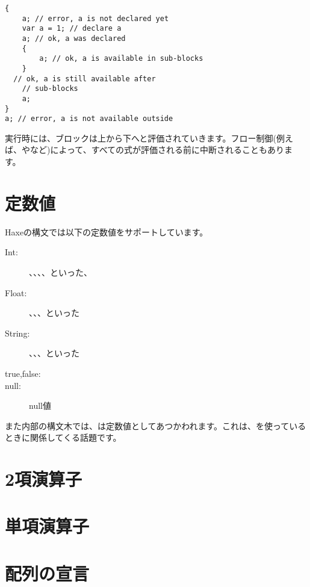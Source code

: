 \begin{lstlisting}
{
	a; // error, a is not declared yet
	var a = 1; // declare a
	a; // ok, a was declared
	{
		a; // ok, a is available in sub-blocks
	}
  // ok, a is still available after
	// sub-blocks	
	a;
}
a; // error, a is not available outside
\end{lstlisting}

実行時には、ブロックは上から下へと評価されていきます。フロー制御(例えば、やなど)によって、すべての式が評価される前に中断されることもあります。

\section{定数値}
\label{expression-constants}

Haxeの構文では以下の定数値をサポートしています。

\begin{description}
	\item[Int:] 、、、、といった、
	\item[Float:] 、、、といった
	\item[String:] 、、、といった
	\item[true,false:] 
	\item[null:] null値
\end{description}

また内部の構文木では、は定数値としてあつかわれます。これは、を使っているときに関係してくる話題です。

\section{2項演算子}
\label{expression-binops}

\section{単項演算子}
\label{expression-unops}

\section{配列の宣言}
\label{expression-array-declaration}

